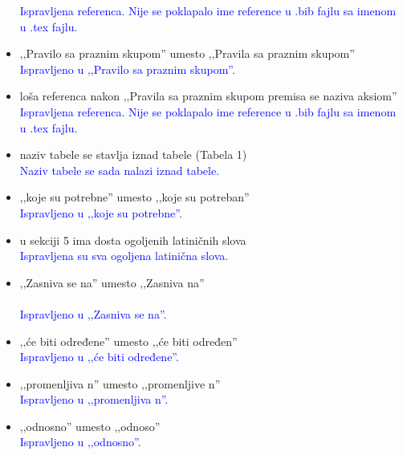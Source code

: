 \documentclass[a4paper]{report}
\newcommand{\odgovor}[1]{\textcolor{blue}{#1}}
\begin{document}
\begin{itemize}
	\odgovor{Ispravljena referenca. Nije se poklapalo ime reference u .bib fajlu sa imenom u .tex fajlu.}
	\item ‚‚Pravilo sa praznim skupom'' umesto ‚‚Pravila sa praznim skupom''\\
	\odgovor{Ispravljeno u ‚‚Pravilo sa praznim skupom''.}
	\item loša referenca nakon ‚‚Pravila sa praznim skupom premisa se naziva aksiom''\\
	\odgovor{Ispravljena referenca. Nije se poklapalo ime reference u .bib fajlu sa imenom u .tex fajlu.}
	\item naziv tabele se stavlja iznad tabele (Tabela 1)\\
	\odgovor{Naziv tabele se sada nalazi iznad tabele.}
	\item ‚‚koje su potrebne'' umesto ‚‚koje su potreban''\\
	\odgovor{Ispravljeno u ‚‚koje su potrebne''.}
	\item u sekciji 5 ima dosta ogoljenih latiničnih slova \\
	\odgovor{Ispravljena su sva ogoljena latinična slova.}
	\item ‚‚Zasniva se na'' umesto ‚‚Zasniva na'' \\\\
	\odgovor{Ispravljeno u ‚‚Zasniva se na''.}
	\item ‚‚će biti određene'' umesto ‚‚će biti određen'' \\
	\odgovor{Ispravljeno u ‚‚će biti određene''. }
	\item ‚‚promenljiva n'' umesto ‚‚promenljive n'' \\
	\odgovor{Ispravljeno u  ‚‚promenljiva n''.}
	\item ‚‚odnosno'' umesto ‚‚odnoso'' \\
	\odgovor{Ispravljeno u ‚‚odnosno''. }
\end{itemize}
\end{document}
